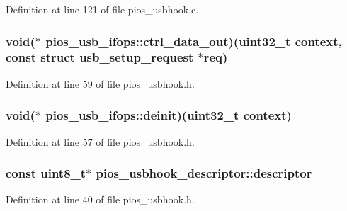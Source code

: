 \-Definition at line 121 of file pios\-\_\-usbhook.\-c.

\hypertarget{group___p_i_o_s___u_s_b_h_o_o_k_ga7fce932d233ec743f190170b5b277746}{
\subsubsection[{ctrl\-\_\-data\-\_\-out}]{\setlength{\rightskip}{0pt plus 5cm}void($\ast$ {\bf pios\-\_\-usb\-\_\-ifops\-::ctrl\-\_\-data\-\_\-out})(uint32\-\_\-t context, const struct {\bf usb\-\_\-setup\-\_\-request} $\ast$req)}}\label{group___p_i_o_s___u_s_b_h_o_o_k_ga7fce932d233ec743f190170b5b277746}


\-Definition at line 59 of file pios\-\_\-usbhook.\-h.

\hypertarget{group___p_i_o_s___u_s_b_h_o_o_k_ga23c8bc133e24838b490c81a9d47318d4}{
\subsubsection[{deinit}]{\setlength{\rightskip}{0pt plus 5cm}void($\ast$ {\bf pios\-\_\-usb\-\_\-ifops\-::deinit})(uint32\-\_\-t context)}}\label{group___p_i_o_s___u_s_b_h_o_o_k_ga23c8bc133e24838b490c81a9d47318d4}


\-Definition at line 57 of file pios\-\_\-usbhook.\-h.

\hypertarget{group___p_i_o_s___u_s_b_h_o_o_k_ga56ff6e20a77e4421c8c47442ca13d75b}{
\subsubsection[{descriptor}]{\setlength{\rightskip}{0pt plus 5cm}const uint8\-\_\-t$\ast$ {\bf pios\-\_\-usbhook\-\_\-descriptor\-::descriptor}}}\label{group___p_i_o_s___u_s_b_h_o_o_k_ga56ff6e20a77e4421c8c47442ca13d75b}


\-Definition at line 40 of file pios\-\_\-usbhook.\-h.

